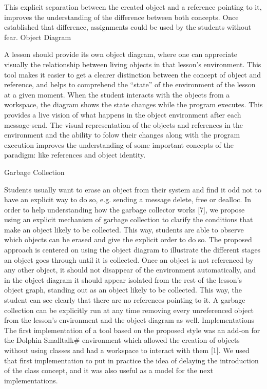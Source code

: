 \documentclass{sigplanconf}
\begin{document}
This explicit separation between the created object and a reference pointing to it, improves the understanding of the difference between both concepts. Once established that difference, assignments could be used by the students without fear.
Object Diagram

A lesson should provide its own object diagram, where one can appreciate
visually the relationship between living objects in that lesson’s environment.
This tool makes it easier to get a clearer distinction between the concept of object and reference, and helps to comprehend the ``state'' of the environment of the lesson at a given moment. When the student interacts with the objects from a workspace, the diagram shows the state changes while the program executes. This provides a live vision of what happens in the object environment after each message-send. The visual representation of the objects and references in the environment and the ability to folow their changes along with the program execution improves the understanding of some important concepts of the paradigm: like references and object identity.

Garbage Collection

Students usually want to erase an object from their system and find it odd not to have an explicit way to do so, e.g. sending a message delete, free or dealloc.
In order to help understanding how the garbage collector works [7], we propose using an explicit mechanism of garbage collection to clarify the conditions that make an object likely to be collected. This way, students are able to observe which objects can be erased and give the explicit order to do so.
The proposed approach is centered on using the object diagram to illustrate the different stages an object goes through until it is collected. Once an object is not referenced by any other object, it should not disappear of the environment automatically, and in the object diagram it should appear isolated from the rest of the lesson's object graph, standing out as an object likely to be collected. This way, the student can see clearly that there are no references pointing to it. A garbage collection can be explicitly run at any time removing every unreferenced object from the lesson's environment and the object diagram as well.
Implementations
The first implementation of a tool based on the proposed style was an add-on for the Dolphin Smalltalk# environment which allowed the creation of objects without using classes and had a workspace to interact with them [1].  We used that first implementation to put in practice the idea of delaying the introduction of the class concept, and it was also useful as a model for the next implementations.
\end{document}
